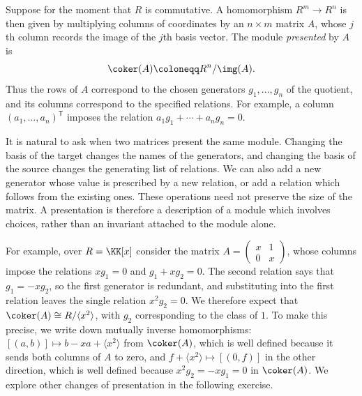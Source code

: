 \documentclass[12pt,reqno]{amsart}
\begin{document}
Suppose for the moment that $R$ is commutative. A homomorphism $R^m\to R^n$ is then given by multiplying columns of coordinates by an $n\times m$ matrix $A$, whose $j$th column records the image of the $j$th basis vector. The module \emph{presented} by $A$ is
\[
\coker(A)\coloneqq R^n/\img(A).
\]
Thus the rows of $A$ correspond to the chosen generators $g_1,\ldots,g_n$ of the quotient, and its columns correspond to the specified relations. For example, a column $(a_1,\ldots,a_n)^{\mathsf T}$ imposes the relation $a_1g_1+\cdots+a_ng_n=0$.

It is natural to ask when two matrices present the same module. Changing the basis of the target changes the names of the generators, and changing the basis of the source changes the generating list of relations. We can also add a new generator whose value is prescribed by a new relation, or add a relation which follows from the existing ones. These operations need not preserve the size of the matrix. A presentation is therefore a description of a module which involves choices, rather than an invariant attached to the module alone.

For example, over $R=\KK[x]$ consider the matrix $A=\left(\begin{smallmatrix}x&1\\0&x\end{smallmatrix}\right)$, whose columns impose the relations $xg_1=0$ and $g_1+xg_2=0$. The second relation says that $g_1=-xg_2$, so the first generator is redundant, and substituting into the first relation leaves the single relation $x^2g_2=0$. We therefore expect that $\coker(A)\cong R/\langle x^2\rangle$, with $g_2$ corresponding to the class of $1$. To make this precise, we write down mutually inverse homomorphisms: $[(a,b)]\mapsto b-xa+\langle x^2\rangle$ from $\coker(A)$, which is well defined because it sends both columns of $A$ to zero, and $f+\langle x^2\rangle\mapsto[(0,f)]$ in the other direction, which is well defined because $x^2g_2=-xg_1=0$ in $\coker(A)$. We explore other changes of presentation in the following exercise.

\hrulefill
\end{document}
